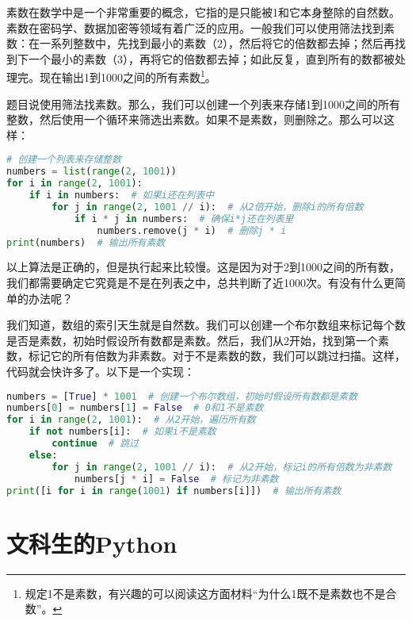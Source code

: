 \documentclass[../main.tex]{subfiles}
\begin{document}
\begin{problem}
    素数在数学中是一个非常重要的概念，它指的是只能被1和它本身整除的自然数。素数在密码学、数据加密等领域有着广泛的应用。一般我们可以使用筛法找到素数：在一系列整数中，先找到最小的素数（2），然后将它的倍数都去掉；然后再找到下一个最小的素数（3），再将它的倍数都去掉；如此反复，直到所有的数都被处理完。现在输出1到1000之间的所有素数\footnote{规定1不是素数，有兴趣的可以阅读这方面材料“为什么1既不是素数也不是合数”。}。
\end{problem}

\begin{solution}
    题目说使用筛法找素数。那么，我们可以创建一个列表来存储1到1000之间的所有整数，然后使用一个循环来筛选出素数。如果不是素数，则删除之。那么可以这样：

\begin{lstlisting}[language=python]
# 创建一个列表来存储整数
numbers = list(range(2, 1001))
for i in range(2, 1001):
    if i in numbers:  # 如果i还在列表中
        for j in range(2, 1001 // i):  # 从2倍开始，删除i的所有倍数
            if i * j in numbers:  # 确保i*j还在列表里
                numbers.remove(j * i)  # 删除j * i
print(numbers)  # 输出所有素数
\end{lstlisting}

以上算法是正确的，但是执行起来比较慢。这是因为对于2到1000之间的所有数，我们都需要确定它究竟是不是在列表之中，总共判断了近1000次。有没有什么更简单的办法呢？

我们知道，数组的索引天生就是自然数。我们可以创建一个布尔数组来标记每个数是否是素数，初始时假设所有数都是素数。然后，我们从2开始，找到第一个素数，标记它的所有倍数为非素数。对于不是素数的数，我们可以跳过扫描。这样，代码就会快许多了。以下是一个实现：

\begin{lstlisting}[language=python]
numbers = [True] * 1001  # 创建一个布尔数组，初始时假设所有数都是素数
numbers[0] = numbers[1] = False  # 0和1不是素数
for i in range(2, 1001):  # 从2开始，遍历所有数
    if not numbers[i]:  # 如果i不是素数
        continue  # 跳过
    else:
        for j in range(2, 1001 // i):  # 从2开始，标记i的所有倍数为非素数
            numbers[j * i] = False  # 标记为非素数
print([i for i in range(1001) if numbers[i]])  # 输出所有素数
\end{lstlisting}
\end{solution}

\section{文科生的Python}
\end{document}
